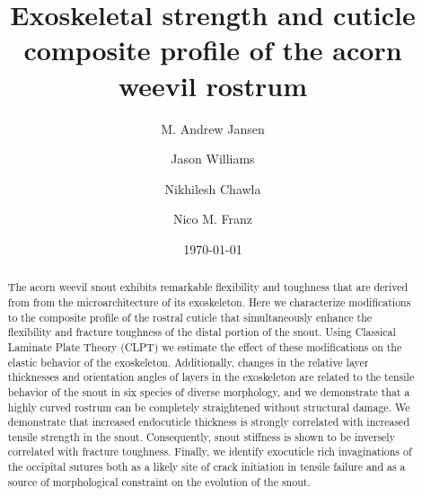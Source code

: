 \documentclass[twocolumn, linenumbers, superscriptaddress, nofootinbib]{revtex4-1}
\begin{document}
	\begin{abstract}
		The acorn weevil snout exhibits remarkable flexibility and toughness that are derived from from the microarchitecture of its exoskeleton.
		Here we characterize modifications to the composite profile of the rostral cuticle that simultaneously enhance the flexibility and fracture toughness of the distal portion of the snout.
		Using Classical Laminate Plate Theory (CLPT) we estimate the effect of these modifications on the elastic behavior of the exoskeleton.
		Additionally, changes in the relative layer thicknesses and orientation angles of layers in the exoskeleton are related to the tensile behavior of the snout in six species of diverse morphology, and we demonstrate that a highly curved rostrum can be completely straightened without structural damage.
		We demonstrate that increased endocuticle thickness is strongly correlated with increased tensile strength in the snout.
		Consequently, snout stiffness is shown to be inversely correlated with fracture toughness.
		Finally, we identify exocuticle rich invaginations of the occipital sutures both as a likely site of crack initiation in tensile failure and as a source of morphological constraint on the evolution of the snout.
		
	\end{abstract}
	
	{\title{Exoskeletal strength and cuticle composite profile of the acorn weevil rostrum}
	\date{\today}
	
	\author{M. Andrew Jansen}
	\author{Jason Williams}
	\author{Nikhilesh Chawla}
	\author{Nico M. Franz}
		
	\maketitle
	}
\end{document}
